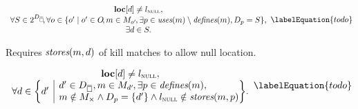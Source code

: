 

\begin{equation}
  \begin{array}{c}
    \mVar{loc}[d] \neq \mNullLocation, \\
    \forall S \in \mPowerset{\mStateDataCompSet} \hspace{-2pt},
    \forall o \in
      \mSetBuilder{o'}%
                  {%
                    o' \in \mOpSet \!,
                    m \in \mMatchSet[o'] \hspace{-1pt},
                    \exists p \in \mUses(m) \setminus \mDefines(m),
                    \mDataSet[p] = S
                  }, \\
    \exists d \in S.
  \end{array}
  \labelEquation{todo}
\end{equation}

Requires \mbox{$\operatorname{\textit{stores}}(m, d)$} of kill matches to allow null location.


%
%

\begin{equation}
  \begin{array}{c}
    \mVar{loc}[d] \neq \mNullLocation, \\
    \forall d \in
      \mSetBuilder*{d'}%
                   {%
                     \begin{array}{@{}l@{}}
                       d' \in \mStateDataCompSet,
                       m \in \mMatchSet[d'] \hspace{-1pt},
                       \exists p \in \mDefines(m), \\
                       m \notin \mKillMatchSet
                       \mAnd
                       \mDataSet[p] = \mSet{d'}
                       \mAnd
                       \mNullLocation \notin \mStores(m, p)
                     \end{array}
                   } \!.
  \end{array}
  \labelEquation{todo}
\end{equation}


